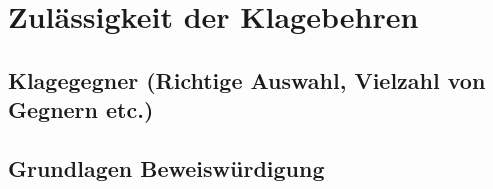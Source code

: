 
\chapter{Zulässigkeit der Klagebehren}
\blindtext[1]
\section{Klagegegner (Richtige Auswahl, Vielzahl von Gegnern etc.)}
\blindtext[5]
\section{Grundlagen Beweiswürdigung}
\blindtext[5]

\chapterbib

